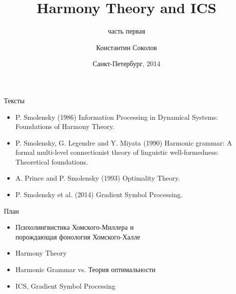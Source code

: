 \documentclass{beamer}
\begin{document}
\title{\Large{Harmony Theory and ICS}}
\subtitle{\small{часть первая}}
\author{Константин Соколов}
\date{Санкт-Петербург, 2014} 
\begin{frame}
    \thispagestyle{empty}
    \titlepage
\end{frame}

\begin{frame}{Тексты}
\setcounter{framenumber}{1}
\begin{itemize}
	\item P. Smolensky (1986) Information Processing in Dynamical Systems: Foundations of Harmony Theory.
    \medskip
    \item P. Smolensky, G. Legendre and Y. Miyata (1990) Harmonic grammar: A formal multi-level connectionist theory of linguistic well-formedness: Theoretical foundations.
    \medskip
    \item A. Prince and P. Smolensky (1993) Optimality Theory.
    \medskip
    \item P. Smolensky et al. (2014) Gradient Symbol Processing.
\end{itemize}
\end{frame}

\begin{frame}{План}
    \begin{itemize}
        \item Психолингвистика Хомского-Миллера и \\порождающая фонология Хомского-Халле
        \medskip
        \item Harmony Theory
        \medskip
        \item Harmonic Grammar vs. Теория оптимальности
        \medskip
        \item ICS, Gradient Symbol Processing
    \end{itemize}
\end{frame}

\end{document}
